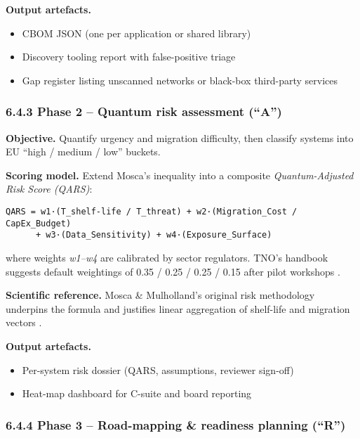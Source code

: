 \documentclass[
  english,
]{article}
\providecommand{\tightlist}{%
  \setlength{\itemsep}{0pt}\setlength{\parskip}{0pt}}
\begin{document}
\textbf{Output artefacts.}

\begin{itemize}
\tightlist
\item
  CBOM JSON (one per application or shared library)
\item
  Discovery tooling report with false-positive triage
\item
  Gap register listing unscanned networks or black-box third-party
  services
\end{itemize}

\subsubsection{6.4.3 Phase 2 -- Quantum risk assessment
(``A'')}\label{phase-2-quantum-risk-assessment-a}

\textbf{Objective.} Quantify urgency and migration difficulty, then
classify systems into EU ``high / medium / low'' buckets.

\textbf{Scoring model.} Extend Mosca's inequality into a composite
\emph{Quantum-Adjusted Risk Score (QARS)}:

\begin{verbatim}
QARS = w1·(T_shelf-life / T_threat) + w2·(Migration_Cost / CapEx_Budget)
      + w3·(Data_Sensitivity) + w4·(Exposure_Surface)
\end{verbatim}

where weights \emph{w1--w4} are calibrated by sector regulators. TNO's
handbook suggests default weightings of 0.35 / 0.25 / 0.25 / 0.15 after
pilot workshops .

\textbf{Scientific reference.} Mosca \& Mulholland's original risk
methodology underpins the formula and justifies linear aggregation of
shelf-life and migration vectors .

\textbf{Output artefacts.}

\begin{itemize}
\tightlist
\item
  Per-system risk dossier (QARS, assumptions, reviewer sign-off)
\item
  Heat-map dashboard for C-suite and board reporting
\end{itemize}

\subsubsection{6.4.4 Phase 3 -- Road-mapping \& readiness planning
(``R'')}\label{phase-3-road-mapping-readiness-planning-r}
\end{document}
